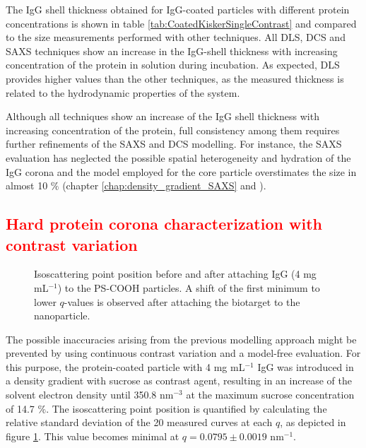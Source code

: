 The IgG shell thickness obtained for IgG-coated particles with different protein concentrations is shown in table \ref{tab:CoatedKiskerSingleContrast} and compared to the size measurements performed with other techniques. All DLS, DCS and SAXS techniques show an increase in the IgG-shell thickness with increasing concentration of the protein in solution during incubation. As expected, DLS provides higher values than the other techniques, as the measured thickness is related to the hydrodynamic properties of the system.

Although all techniques show an increase of the IgG shell thickness with increasing concentration of the protein, full consistency among them requires further refinements of the SAXS and DCS modelling. For instance, the SAXS evaluation has neglected the possible spatial heterogeneity and hydration of the IgG corona and the model employed for the core particle overstimates the size in almost 10 $\%$ (chapter \ref{chap:density_gradient_SAXS} and \cite{minelli_characterization_2014}).

\subsection{\textcolor{red}{Hard protein corona characterization with contrast variation}}
\label{sec:coated_kisker_continuous}

\begin{figure}
	\centering
		
		\caption[Isoscattering point position before and after attaching IgG.]{Isoscattering point position before and after attaching IgG (4 mg mL$^{-1}$) to the PS-COOH particles. A shift of the first minimum to lower $q$-values is observed after attaching the biotarget to the nanoparticle.}
		\label{fig:CoatedKiskerIsopointComp}
\end{figure}

The possible inaccuracies arising from the previous modelling approach might be prevented by using continuous contrast variation and a model-free evaluation. For this purpose, the protein-coated particle with 4 mg mL$^{-1}$ IgG was introduced in a density gradient with sucrose as contrast agent, resulting in an increase of the solvent electron density until 350.8 nm$^{-3}$ at the maximum sucrose concentration of 14.7 $\%$. The isoscattering point position is quantified by calculating the relative standard deviation of the 20 measured curves at each $q$, as depicted in figure \ref{fig:CoatedKiskerIsopointComp}. This value becomes minimal at $q=0.0795\pm0.0019$ nm$^{-1}$.

